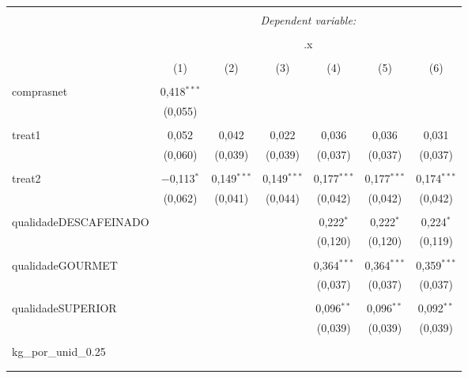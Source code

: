 
\begin{table}[!htbp] \centering 
  \caption{} 
  \label{} 
\begin{tabular}{@{\extracolsep{5pt}}lcccccc} 
\\[-1.8ex]\hline 
\hline \\[-1.8ex] 
 & \multicolumn{6}{c}{\textit{Dependent variable:}} \\ 
\cline{2-7} 
\\[-1.8ex] & \multicolumn{6}{c}{.x} \\ 
\\[-1.8ex] & (1) & (2) & (3) & (4) & (5) & (6)\\ 
\hline \\[-1.8ex] 
 comprasnet & 0,418$^{***}$ &  &  &  &  &  \\ 
  & (0,055) &  &  &  &  &  \\ 
  & & & & & & \\ 
 treat1 & 0,052 & 0,042 & 0,022 & 0,036 & 0,036 & 0,031 \\ 
  & (0,060) & (0,039) & (0,039) & (0,037) & (0,037) & (0,037) \\ 
  & & & & & & \\ 
 treat2 & $-$0,113$^{*}$ & 0,149$^{***}$ & 0,149$^{***}$ & 0,177$^{***}$ & 0,177$^{***}$ & 0,174$^{***}$ \\ 
  & (0,062) & (0,041) & (0,044) & (0,042) & (0,042) & (0,042) \\ 
  & & & & & & \\ 
 qualidadeDESCAFEINADO &  &  &  & 0,222$^{*}$ & 0,222$^{*}$ & 0,224$^{*}$ \\ 
  &  &  &  & (0,120) & (0,120) & (0,119) \\ 
  & & & & & & \\ 
 qualidadeGOURMET &  &  &  & 0,364$^{***}$ & 0,364$^{***}$ & 0,359$^{***}$ \\ 
  &  &  &  & (0,037) & (0,037) & (0,037) \\ 
  & & & & & & \\ 
 qualidadeSUPERIOR &  &  &  & 0,096$^{**}$ & 0,096$^{**}$ & 0,092$^{**}$ \\ 
  &  &  &  & (0,039) & (0,039) & (0,039) \\ 
  & & & & & & \\ 
 kg\_por\_unid\_0.25 &  &  &  &  &  &  \\ 
  &  &  &  &  &  &  \\ 
  & & & & & & \\ 

\end{tabular}
\end{table}
